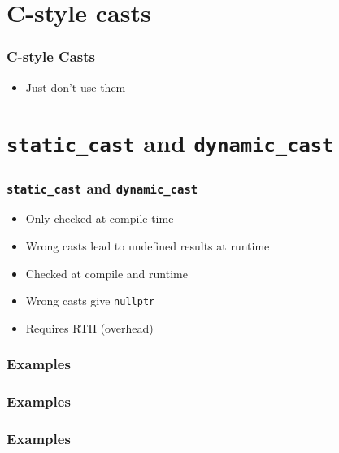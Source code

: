 \documentclass{../ucll-slides}
\begin{document}
\section{C-style casts}

\frame{\tableofcontents[currentsection]}

\begin{frame}
  \frametitle{C-style Casts}
  \begin{itemize}
    \item Just don't use them
  \end{itemize}
\end{frame}

\section{{\tt static\_cast} and {\tt dynamic\_cast}}

\frame{\tableofcontents[currentsection]}


\begin{frame}
  \frametitle{{\tt static\_cast} and {\tt dynamic\_cast}}
  \begin{itemize}
    \item Only checked at compile time
    \item Wrong casts lead to undefined results at runtime
  \end{itemize}
  \vskip5mm
  \begin{itemize}
    \item Checked at compile and runtime
    \item Wrong casts give {\tt nullptr}
    \item Requires RTII (overhead)
  \end{itemize}
\end{frame}

\begin{frame}
  \frametitle{Examples}
\end{frame}

\begin{frame}
  \frametitle{Examples}
\end{frame}

\begin{frame}
  \frametitle{Examples}
\end{frame}
\end{document}
